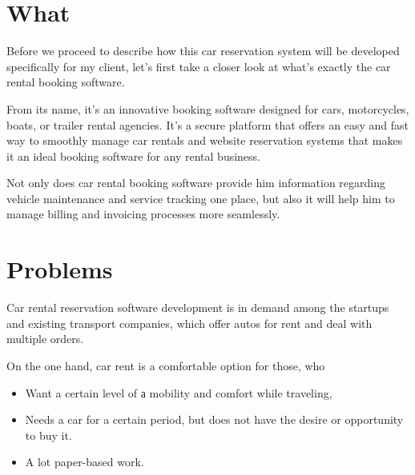 \documentclass{article}
\begin{document}
\newcommand{\HRule}{\rule{\linewidth}{0.5mm}}



\newpage

\section{What}

    Before we proceed to describe how this car reservation system will be developed specifically for my client, let's first take a closer look at what’s exactly the car rental booking software. 
    
    \vspace{0.3cm}
    
    From its name, it’s an innovative booking software designed for cars, motorcycles, boats, or trailer rental agencies. It's a secure platform that offers an easy and fast way to smoothly manage car rentals and website reservation systems that makes it an ideal booking software for any rental business.

    \vspace{0.3cm}
    
    Not only does car rental booking software provide him information regarding vehicle maintenance and service tracking one place, but also it will help him to manage billing and invoicing processes more seamlessly.

\section{Problems}

        Car rental reservation software development is in demand among the startups and existing transport companies, which offer autos for rent and deal with multiple orders. 
        
        \vspace{0.3cm}
        
        On the one hand, car rent is a comfortable option for those, who
        
        \vspace{0.3cm}
        
    \begin{itemize}
    
        \item Want a certain level of а mobility and comfort while traveling,
        
        \item Needs a car for a certain period, but does not have the desire or opportunity to buy it.

        \item A lot paper-based work.
        
     \end{itemize}
     
\end{document}
